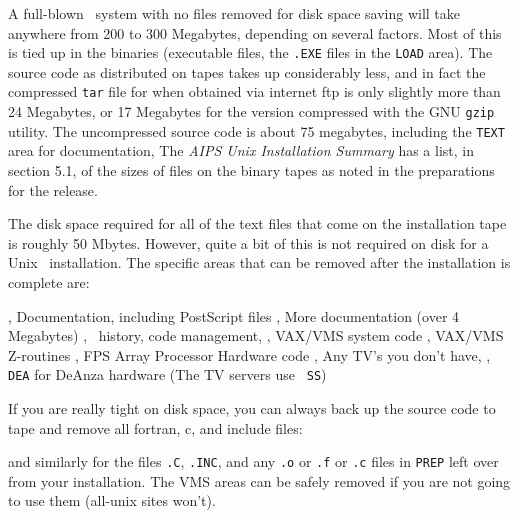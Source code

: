 A full-blown \AIPS\ system with no files removed for disk space saving
will take anywhere from 200 to 300 Megabytes, depending on several
factors.  Most of this is tied up in the binaries (executable files, the
{\tt *.EXE} files in the {\tt\dol LOAD} area).  The source code as
distributed on tapes takes up considerably less, and in fact the
compressed {\tt tar} file for {\tt \thisver} when obtained via internet
ftp is only slightly more
than 24 Megabytes, or 17 Megabytes for the version compressed with the
GNU {\tt gzip} utility.  The uncompressed source code is about 75
megabytes, including the {\tt TEXT} area for documentation, \etc
The {\it AIPS Unix Installation Summary} has a list, in section 5.1,
of the sizes of files on the binary tapes as noted in the preparations for
the release.

\medskip{}

The disk space required for all of the text files that come on the
installation tape is roughly 50 Mbytes.
However, quite a bit of this is not required on disk for a Unix
\AIPS\ installation.  The specific areas that can be removed after the
installation is complete are:\medskip

{, Documentation, including PostScript files}
{, More documentation (over 4 Megabytes)}
{, \AIPS\ history, code management, \etc}
{, VAX/VMS system code}
{, VAX/VMS Z-routines}
{, FPS Array Processor Hardware code}
{, Any TV's you don't have, \eg,
        {\tt DEA} for DeAnza hardware (The TV servers use {\tt
        SS})\medskip}\medskip

\noindent If you are really tight on disk space, you can always back up
the source code to tape and remove all fortran, c, and include
files:\medskip

\medskip

\noindent and similarly for the files {\tt *.C}, {\tt *.INC}, and any
{\tt *.o} or {\tt *.f} or {\tt *.c} files in {\tt \dol PREP} left over
from your installation.  The VMS areas can be safely removed if you are
not going to use them (all-unix sites won't).

